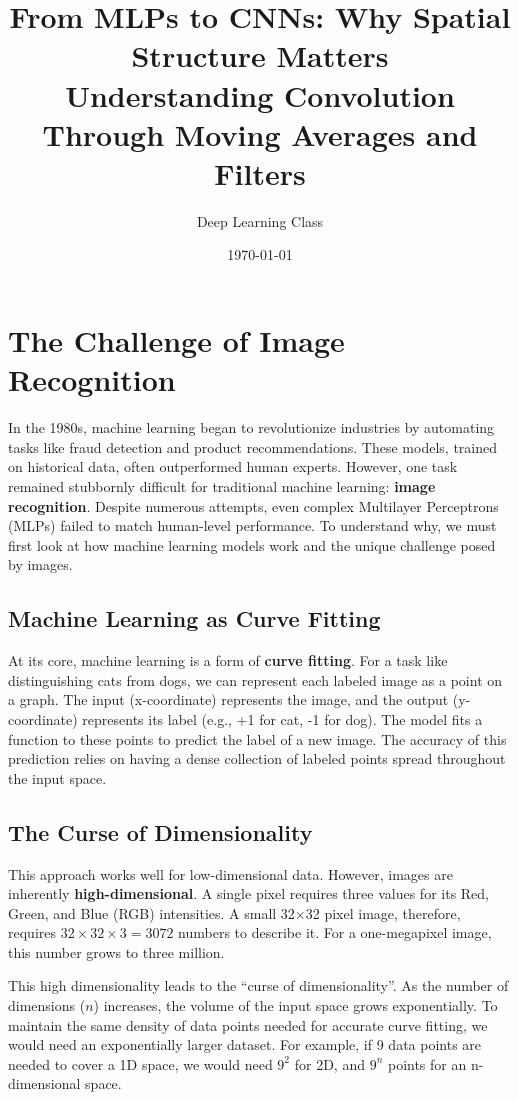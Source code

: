 \documentclass{article}
\title{From MLPs to CNNs: Why Spatial Structure Matters\\
Understanding Convolution Through Moving Averages and Filters}
\author{Deep Learning Class}
\date{\today}
\begin{document}
\maketitle

\section{The Challenge of Image Recognition}

In the 1980s, machine learning began to revolutionize industries by automating tasks like fraud detection and product recommendations. These models, trained on historical data, often outperformed human experts. However, one task remained stubbornly difficult for traditional machine learning: \textbf{image recognition}. Despite numerous attempts, even complex Multilayer Perceptrons (MLPs) failed to match human-level performance. To understand why, we must first look at how machine learning models work and the unique challenge posed by images.

\subsection{Machine Learning as Curve Fitting}
At its core, machine learning is a form of \textbf{curve fitting}. For a task like distinguishing cats from dogs, we can represent each labeled image as a point on a graph. The input (x-coordinate) represents the image, and the output (y-coordinate) represents its label (e.g., +1 for cat, -1 for dog). The model fits a function to these points to predict the label of a new image. The accuracy of this prediction relies on having a dense collection of labeled points spread throughout the input space.

\subsection{The Curse of Dimensionality}
This approach works well for low-dimensional data. However, images are inherently \textbf{high-dimensional}. A single pixel requires three values for its Red, Green, and Blue (RGB) intensities. A small 32×32 pixel image, therefore, requires $32 \times 32 \times 3 = 3072$ numbers to describe it. For a one-megapixel image, this number grows to three million.

This high dimensionality leads to the ``curse of dimensionality''. As the number of dimensions ($n$) increases, the volume of the input space grows exponentially. To maintain the same density of data points needed for accurate curve fitting, we would need an exponentially larger dataset. For example, if 9 data points are needed to cover a 1D space, we would need $9^2$ for 2D, and $9^n$ points for an n-dimensional space.
\end{document}
